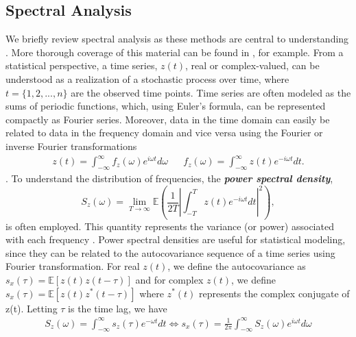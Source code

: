 \documentclass{stat572Style}
\begin{document}
	\subsection{Spectral Analysis}
	\label{sec: specAnalysis}
	\indent We briefly review spectral analysis as these methods are central to understanding \citet{Sykulski2016}.  
	More thorough coverage of this material can be found in  \citep{Percival1993}, for example. 
	From a statistical perspective, a time series, $z(t)$, real or complex-valued,  can be understood as a realization of a stochastic process over time, where  $t = \{1,2,...,n\}$ are the observed time points.  
	Time series are often modeled as the sums of periodic functions, which, using Euler's formula, can be represented compactly as Fourier series. 
	Moreover, data in the time domain can easily be related to data in the frequency domain and vice versa using the Fourier or inverse Fourier transformations 	\begin{align}
z(t) = \int_{-\infty}^{\infty} f_{z}(\omega)e^{i\omega t}d\omega && f_{z}(\omega) = \int_{-\infty}^{\infty} z(t) e^{-i \omega t }dt.
\end{align}
\citep{Percival1993}. 
To understand the distribution of frequencies, the \textbf{\it{power spectral density}},
\begin{equation}
S_{z}(\omega) = \underset{T \rightarrow \infty}{\lim} \mathbb{E} \left(\frac{1}{2T} \left| \int_{-T}^{T} z(t) e^{-i \omega t}dt \right|^{2} \right),
\end{equation}
is often employed. 
This quantity represents the variance (or power) associated with each frequency \citep{Percival1993}. 
Power spectral densities are useful for statistical modeling, since they can be related to the autocovariance sequence of a time series using  Fourier transformation.  
For real $z(t)$, we define the autocovariance as $s_{x}(\tau) = \mathbb{E}[z(t) z(t - \tau)] $ and for complex $z(t)$, we define $s_{x}(\tau) = \mathbb{E}[z(t) z^{*}(t - \tau)] $ where $z^{*}(t)$ represents the complex conjugate of z(t). Letting $\tau$ is the time lag, we have
\begin{align}
\label{eq: fourierPair}
S_{z}(\omega) = \int_{-\infty}^{\infty}s_{z}(\tau) e^{-\omega t}dt  \Longleftrightarrow s_{x}(\tau) = \frac{1}{2\pi} \int_{-\infty}^{\infty}S_{z}(\omega) e^{i \omega t} d\omega 
\end{align}
\end{document}
